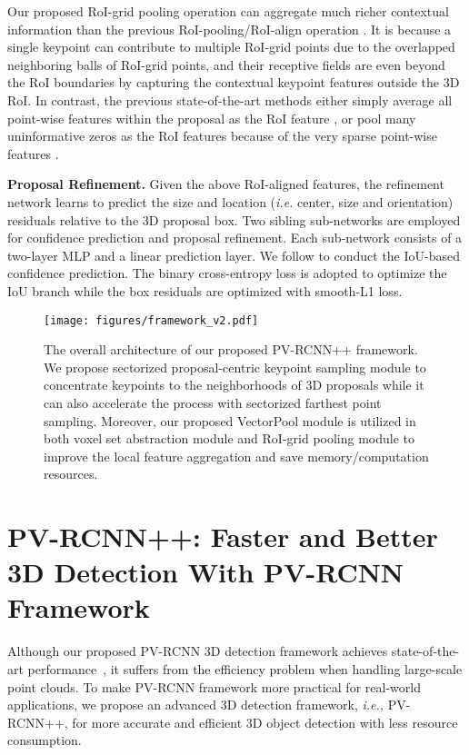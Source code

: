 \documentclass[natbib,twocolumn]{svjour3}          \smartqed  \usepackage{graphicx}
\begin{document}
Our proposed RoI-grid pooling operation can aggregate much richer contextual information than the previous RoI-pooling/RoI-align operation \citep{shi2019pointrcnn,std2019yang,shi2020part}. 
It is because a single keypoint can contribute to multiple RoI-grid points due to the overlapped neighboring balls of RoI-grid points, and their receptive fields are even beyond the RoI boundaries by capturing the contextual keypoint features outside the 3D RoI. In contrast, the previous state-of-the-art methods either simply average all point-wise features within the proposal as the RoI feature \citep{shi2019pointrcnn}, or pool many uninformative zeros as the RoI features because of the very sparse point-wise features \citep{shi2020part,std2019yang}. 


\noindent
\textbf{Proposal Refinement.} 
Given the above RoI-aligned features, the refinement network learns to predict the size and location (\emph{i.e.} center, size and orientation) residuals relative to the 3D proposal box. 
Two sibling sub-networks are employed for confidence prediction and proposal refinement. Each sub-network consists of a two-layer MLP and a linear prediction layer. 
We follow \citep{shi2020part} to conduct the IoU-based confidence prediction.
The binary cross-entropy loss is adopted to optimize the IoU branch while the box residuals are optimized with smooth-L1 loss. 


\begin{figure*}
	\begin{center}	\texttt{[image: figures/framework\_v2.pdf]}
	\end{center}
	\vspace{-2mm}
	\caption{The overall architecture of our proposed PV-RCNN++ framework. We propose sectorized proposal-centric keypoint sampling module to concentrate keypoints to the neighborhoods of 3D proposals while it can also accelerate the process with sectorized farthest point sampling. Moreover, our proposed VectorPool module is utilized in both voxel set abstraction module and RoI-grid pooling module to improve the local feature aggregation and save memory/computation resources.}
	\label{fig:framework_v2}
\end{figure*}


\section{PV-RCNN++: Faster and Better 3D Detection With PV-RCNN Framework}
Although our proposed PV-RCNN 3D detection framework achieves state-of-the-art performance~\citep{shi2020pv}, it suffers from the efficiency problem when handling large-scale point clouds. 
To make PV-RCNN framework more practical for real-world applications, we propose an advanced 3D detection framework, \emph{i.e.,} PV-RCNN++, for more accurate and efficient 3D object detection with less resource consumption. 
\end{document}
